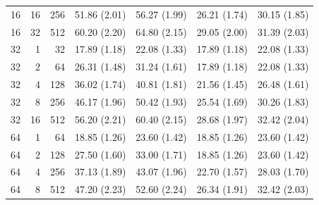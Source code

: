 \begin{table}[p]
\begin{tabular}{@{}rrr rrrr@{}}
16 & 16 & 256 & 51.86 {\scriptsize (2.01)} & 56.27 {\scriptsize (1.99)} & 26.21 {\scriptsize (1.74)} & 30.15 {\scriptsize (1.85)} \\
16 & 32 & 512 & 60.20 {\scriptsize (2.20)} & 64.80 {\scriptsize (2.15)} & 29.05 {\scriptsize (2.00)} & 31.39 {\scriptsize (2.03)} \\
\midrule
32 & 1 & 32 & 17.89 {\scriptsize (1.18)} & 22.08 {\scriptsize (1.33)} & 17.89 {\scriptsize (1.18)} & 22.08 {\scriptsize (1.33)} \\
32 & 2 & 64 & 26.31 {\scriptsize (1.48)} & 31.24 {\scriptsize (1.61)} & 17.89 {\scriptsize (1.18)} & 22.08 {\scriptsize (1.33)} \\
32 & 4 & 128 & 36.02 {\scriptsize (1.74)} & 40.81 {\scriptsize (1.81)} & 21.56 {\scriptsize (1.45)} & 26.48 {\scriptsize (1.61)} \\
32 & 8 & 256 & 46.17 {\scriptsize (1.96)} & 50.42 {\scriptsize (1.93)} & 25.54 {\scriptsize (1.69)} & 30.26 {\scriptsize (1.83)} \\
32 & 16 & 512 & 56.20 {\scriptsize (2.21)} & 60.40 {\scriptsize (2.15)} & 28.68 {\scriptsize (1.97)} & 32.42 {\scriptsize (2.04)} \\
\midrule
64 & 1 & 64 & 18.85 {\scriptsize (1.26)} & 23.60 {\scriptsize (1.42)} & 18.85 {\scriptsize (1.26)} & 23.60 {\scriptsize (1.42)} \\
64 & 2 & 128 & 27.50 {\scriptsize (1.60)} & 33.00 {\scriptsize (1.71)} & 18.85 {\scriptsize (1.26)} & 23.60 {\scriptsize (1.42)} \\
64 & 4 & 256 & 37.13 {\scriptsize (1.89)} & 43.07 {\scriptsize (1.96)} & 22.70 {\scriptsize (1.57)} & 28.03 {\scriptsize (1.70)} \\
64 & 8 & 512 & 47.20 {\scriptsize (2.23)} & 52.60 {\scriptsize (2.24)} & 26.34 {\scriptsize (1.91)} & 32.42 {\scriptsize (2.03)} \\
\bottomrule
\end{tabular}
\end{table}
